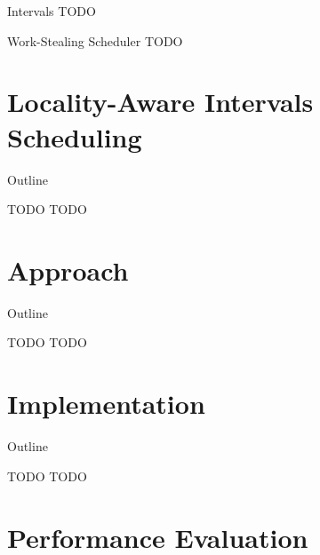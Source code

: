 \begin{frame}{Intervals}
  TODO
\end{frame}

\note{
}

\begin{frame}{Work-Stealing Scheduler}
  TODO
\end{frame}

\note{
}


\section{Locality-Aware Intervals Scheduling}

\begin{frame}{Outline}
  \tableofcontents[current]
\end{frame}

\note{
}

\begin{frame}{TODO}
  TODO
\end{frame}

\note{
}


\section{Approach}

\begin{frame}{Outline}
  \tableofcontents[current]
\end{frame}

\note{
}

\begin{frame}{TODO}
  TODO
\end{frame}

\note{
}


\section{Implementation}

\begin{frame}{Outline}
  \tableofcontents[current]
\end{frame}

\note{
}

\begin{frame}{TODO}
  TODO
\end{frame}

\note{
}


\section{Performance Evaluation}

